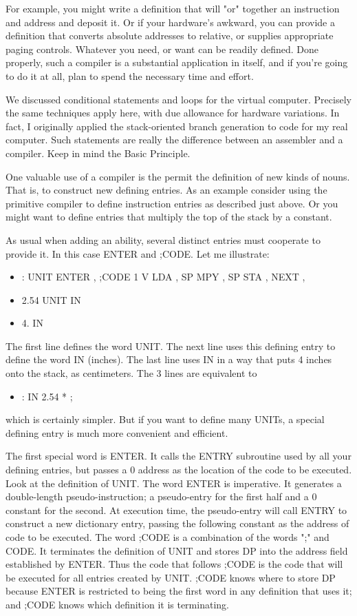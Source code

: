 \documentclass[b5paper, oneside]{book}
\begin{document}
For example, you might write a definition that will "or" together an instruction and address and deposit it. Or if your hardware's awkward, you can provide a definition that converts absolute addresses to relative, or supplies appropriate paging controls. Whatever you need, or want can be readily defined. Done properly, such a compiler is a substantial application in itself, and if you're going to do it at all, plan to spend the necessary time and effort.

We discussed conditional statements and loops for the virtual computer. Precisely the same techniques apply here, with due allowance for hardware variations. In fact, I originally applied the stack-oriented branch generation to code for my real computer. Such statements are really the difference between an assembler and a compiler. Keep in mind the Basic Principle.

One valuable use of a compiler is the permit the definition of new kinds of nouns. That is, to construct new defining entries. As an example consider using the primitive compiler to define instruction entries as described just above. Or you might want to define entries that multiply the top of the stack by a constant.

As usual when adding an ability, several distinct entries must cooperate to provide it. In this case ENTER and ;CODE. Let me illustrate:\begin{itemize}
   \item : UNIT ENTER , ;CODE 1 V LDA , SP MPY , SP STA , NEXT ,
   \item 2.54 UNIT IN
   \item 4. IN\end{itemize}
The first line defines the word UNIT. The next line uses this defining entry to define the word IN (inches). The last line uses IN in a way that puts 4 inches onto the stack, as centimeters. The 3 lines are equivalent to\begin{itemize}
   \item : IN 2.54 * ;\end{itemize}
which is certainly simpler. But if you want to define many UNITs, a special defining entry is much more convenient and efficient.

The first special word is ENTER. It calls the ENTRY subroutine used by all your defining entries, but passes a 0 address as the location of the code to be executed. Look at the definition of UNIT. The word ENTER is imperative. It generates a double-length pseudo-instruction; a pseudo-entry for the first half and a 0 constant for the second. At execution time, the pseudo-entry will call ENTRY to construct a new dictionary entry, passing the following constant as the address of code to be executed. The word ;CODE is a combination of the words ";" and CODE. It terminates the definition of UNIT and stores DP into the address field established by ENTER. Thus the code that follows ;CODE is the code that will be executed for all entries created by UNIT. ;CODE knows where to store DP because ENTER is restricted to being the first word in any definition that uses it; and ;CODE knows which definition it is terminating.
\end{document}
